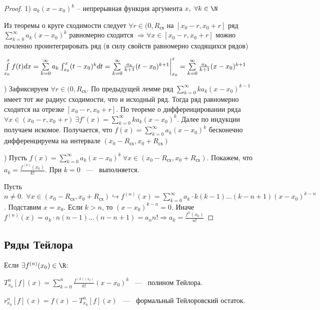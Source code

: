 \begin{proof}
    1) $a_k(x - x_0)^k$ -- непрерывная функция аргумента $x, \ \forall k \in \N$

    \noindent Из теоремы о круге сходимости следует $\forall  r \in (0, R_{\text{сх}}$ на $[x_0 - r, x_0 + r]$ ряд $\sum\limits_{k = 0}^\infty a_k(x -x_0)^k$ равномерно сходится $\Rightarrow \forall  x \in [x_0 - r, x_0 + r]$ можно почленно проинтегрировать ряд (в силу свойств равномерно сходящихся рядов)

    $\noindent \int\limits_{x_0}^{x}f(t)dx = \sum\limits_{k = 0}^\infty a_k \int_{x_0}^{x} (t - x_0)^k dt = \sum\limits_{k = 0}^\infty \frac{a_k}{k + 1}(t - x_0)^{k + 1} \bigg|_{x_0}^x = \sum\limits_{k = 0}^\infty \frac{a_k}{k + 1}(x - x_0)^{k + 1}$

    ) Зафиксируем $\forall  r \in (0, R_{\text{сх}}$. По предыдущей лемме ряд $\sum\limits_{k = 0}^\infty ka_k(x - x_0)^{k - 1}$ имеет тот же радиус сходимости, что и исходный ряд. Тогда ряд равномерно сходится на отрезке $[x_0 - r, x_0 + r]$. По теореме о дифференцировании ряда $\forall  x \in (x_0 - r, x_0 + r) \ \exists f'(x) = \sum\limits_{k = 0}^\infty ka_k(x - x_0)^k$. Далее по индукции получаем искомое.  Получается, что $f(x) = \sum\limits_{k = 0}^\infty a_k(x - x_0)^k$ бесконечно дифференцируема на интервале $(x_0 - R_{\text{сх}}, x_0 + R_{\text{сх}})$

    ) Пусть $f(x) = \sum\limits_{k = 0}^\infty a_k(x - x_0)^k \ \forall  x \in (x_0 - R_{\text{сх}}, x_0 + R_{\text{сх}})$. Покажем, что $a_k = \frac{f^{(k)}(x_0)}{k!}$. При $k = 0$ ~---~ выполняется. 

    \noindent Пусть $n \neq 0. \ \ \forall x \in (x_0 - R_{\text{сх}}, x_0 + R_{\text{сх}}) \hookrightarrow f^{(n)}(x) = \sum\limits_{k = 0}^\infty a_k \cdot k(k - 1)\dots(k - n + 1)(x - x_0)^{k - n}$. Подставим $x = x_0$. Если $k > n$, то $(x - x_0)^{k - n} = 0$. Иначе $f^{(n)}(x) = a_k \cdot n(n - 1)\dots(n - n + 1) = a_nn! \Rightarrow a_k = \frac{f^{n}(x_0)}{n!}$
\end{proof}

\subsection{Ряды Тейлора}
\begin{reminder}
    Если $\exists f^{(n)}(x_0) \in \R$: 

    \noindent $T_{x_0}^n[f](x) = \sum\limits_{k = 0}^n \frac{f^{(k)(x_0)}}{k!}(x - x_0)^k$ ~---~ полином Тейлора. 

    \noindent $r^n_{x_0}[f](x) = f(x) - T_{x_0}^n[f](x)$ ~---~ формальный Тейлоровский остаток. 
\end{reminder}

